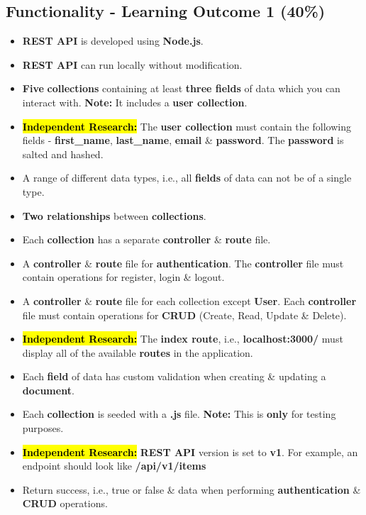 \documentclass{article}
\begin{document}
\subsection*{Functionality - Learning Outcome 1 (40\%)}
\begin{itemize}
	\item \textbf{REST API} is developed using \textbf{Node.js}.
	\item \textbf{REST API} can run locally without modification.
	\item \textbf{Five} \textbf{collections} containing at least \textbf{three fields} of data which you can interact with. \textbf{Note:} It includes a \textbf{user collection}.
	\item \hl{\textbf{Independent Research:}} The \textbf{user collection} must contain the following fields - \textbf{first\_name}, \textbf{last\_name}, \textbf{email} \& \textbf{password}. The \textbf{password} is salted and hashed.
	\item A range of different data types, i.e., all \textbf{fields} of data can not be of a single type.
	\item \textbf{Two relationships} between \textbf{collections}.
	\item Each \textbf{collection} has a separate \textbf{controller} \& \textbf{route} file.
	\item A \textbf{controller} \& \textbf{route} file for \textbf{authentication}. The \textbf{controller} file must contain operations for register, login \& logout.
	\item A \textbf{controller} \& \textbf{route} file for each collection except \textbf{User}. Each \textbf{controller} file must contain operations for \textbf{CRUD} (Create, Read, Update \& Delete).
	\item \hl{\textbf{Independent Research:}} The \textbf{index route}, i.e., \textbf{localhost:3000/} must display all of the available \textbf{routes} in the application.
	\item Each \textbf{field} of data has custom validation when creating \& updating a \textbf{document}.
	\item Each \textbf{collection} is seeded with a \textbf{.js} file. \textbf{Note:} This is \textbf{only} for testing purposes.
	\item \hl{\textbf{Independent Research:}} \textbf{REST API} version is set to \textbf{v1}. For example, an endpoint should look like \textbf{/api/v1/items}
	\item Return success, i.e., true or false \& data when performing \textbf{authentication} \& \textbf{CRUD} operations.

\end{itemize}
\end{document}
